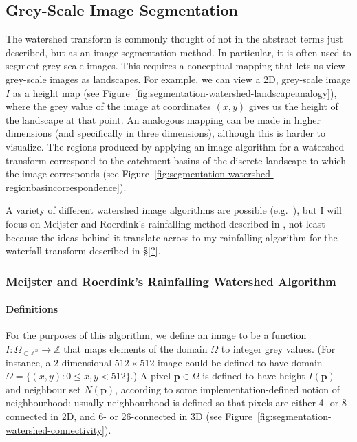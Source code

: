
\subsection{Grey-Scale Image Segmentation}

The watershed transform is commonly thought of not in the abstract terms just described, but as an image segmentation method. In particular, it is often used to segment grey-scale images. This requires a conceptual mapping that lets us view grey-scale images as landscapes. For example, we can view a 2D, grey-scale image $I$ as a height map (see Figure~\ref{fig:segmentation-watershed-landscapeanalogy}), where the grey value of the image at coordinates $(x,y)$ gives us the height of the landscape at that point. An analogous mapping can be made in higher dimensions (and specifically in three dimensions), although this is harder to visualize. The regions produced by applying an image algorithm for a watershed transform correspond to the catchment basins of the discrete landscape to which the image corresponds (see Figure~\ref{fig:segmentation-watershed-regionbasincorrespondence}).



A variety of different watershed image algorithms are possible (e.g.~\cite{bieniek00,meijster98,osma-ruiz06,rambabu07,stoev00}), but I will focus on Meijster and Roerdink's rainfalling method described in \cite{meijster98}, not least because the ideas behind it translate across to my rainfalling algorithm for the waterfall transform described in \S\ref{?}.

\subsubsection{Meijster and Roerdink's Rainfalling Watershed Algorithm}

\paragraph{Definitions}

For the purposes of this algorithm, we define an image to be a function $I: \Omega_{\subset \mathbb{Z}^n} \to \mathbb{Z}$ that maps elements of the domain $\Omega$ to integer grey values. (For instance, a $2$-dimensional $512 \times 512$ image could be defined to have domain $\Omega = \{(x,y) : 0 \le x,y < 512\}$.) A pixel $\mathbf{p} \in \Omega$ is defined to have height $I(\mathbf{p})$ and neighbour set $N(\mathbf{p})$, according to some implementation-defined notion of neighbourhood: usually neighbourhood is defined so that pixels are either 4- or 8-connected in 2D, and 6- or 26-connected in 3D (see Figure~\ref{fig:segmentation-watershed-connectivity}).

